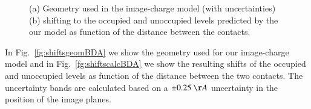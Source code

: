 \documentclass[aip,jcp,a4paper,reprint,floatfix,superscriptaddress]{revtex4-1}
\begin{document}
\begin{figure}
\caption{(a) Geometry used in the image-charge model (with uncertainties) (b) shifting  to  the occupied and unoccupied levels predicted by the our model as function of the distance between the contacts.
}\label{fg:contactsBDA}
\end{figure}

In Fig.~\ref{fg:shiftsgeomBDA} we show the geometry used for our image-charge model and in Fig.~\ref{fg:shiftscalcBDA} we show the resulting shifts of the occupied and unoccupied levels as function of the distance between the two contacts. The uncertainty bands are calculated based on a $\pm0.25\ \AA$ uncertainty in the position of the image planes.
\end{document}
